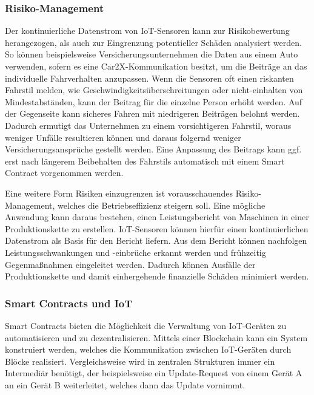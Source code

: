 \subsubsection{Risiko-Management}
\label{sec:Risk_Management}
Der kontinuierliche Datenstrom von IoT-Sensoren kann zur Risikobewertung herangezogen, als auch zur 
Eingrenzung potentieller Schäden analysiert werden.
So können beispielsweise Versicherungsunternehmen die Daten aus einem Auto verwenden, sofern es eine 
Car2X-Kommunikation besitzt, um die Beiträge an das individuelle Fahrverhalten
anzupassen. 
Wenn die Sensoren oft einen riskanten Fahrstil melden, wie Geschwindigkeitsüberschreitungen oder 
nicht-einhalten von Mindestabständen, kann der Beitrag für die einzelne Person erhöht werden. Auf der 
Gegenseite kann sicheres Fahren mit niedrigeren Beiträgen belohnt werden. 
Dadurch ermutigt das Unternehmen zu einem vorsichtigeren Fahrstil, woraus weniger Unfälle resultieren 
können und daraus folgernd weniger Versicherungsansprüche gestellt werden.
\cite[p.~169f]{chowdhary2025smart}
Eine Anpassung des Beitrags kann ggf. erst nach längerem Beibehalten des Fahrstils automatisch mit einem 
Smart Contract vorgenommen werden.

Eine weitere Form Risiken einzugrenzen ist vorausschauendes Risiko-Management, welches die 
Betriebseffizienz steigern soll.
Eine mögliche Anwendung kann daraus bestehen, einen Leistungsbericht von Maschinen in einer Produktionskette
zu erstellen. IoT-Sensoren können hierfür einen kontinuierlichen Datenstrom als Basis für den Bericht liefern.
Aus dem Bericht können nachfolgen Leistungsschwankungen und -einbrüche erkannt werden und frühzeitig 
Gegenma\ss nahmen eingeleitet werden. Dadurch können Ausfälle der Produktionskette und damit einhergehende 
finanzielle Schäden minimiert werden.
\cite[p.~169]{chowdhary2025smart}





\subsubsection{Smart Contracts und IoT}
Smart Contracts bieten die Möglichkeit die Verwaltung von IoT-Geräten zu automatisieren und zu dezentralisieren.
Mittels einer Blockchain kann ein System konstruiert werden, welches die Kommunikation zwischen IoT-Geräten
durch Blöcke realisiert. 
Vergleichsweise wird in zentralen Strukturen immer ein Intermediär benötigt, der beispielsweise ein 
Update-Request von einem Gerät A an ein Gerät B weiterleitet, welches dann das Update vornimmt.

